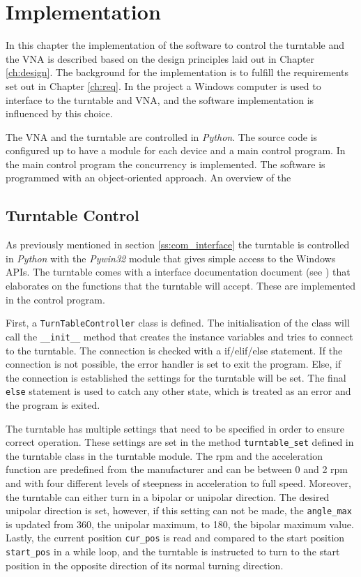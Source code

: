 \chapter{Implementation} \label{ch:implementation}
In this chapter the implementation of the software to control the turntable and the VNA is described based on the design principles laid out in Chapter \ref{ch:design}. The background for the implementation is to fulfill the requirements set out in Chapter \ref{ch:req}. In the project a Windows computer is used to interface to the turntable and VNA, and the software implementation is influenced by this choice. 

The VNA and the turntable are controlled in \textit{Python}. The source code is configured up to have a module for each device and a main control program. In the main control program the concurrency is implemented. The software is programmed with an object-oriented approach. An overview of the 

\section{Turntable Control}
As previously mentioned in section \ref{ss:com_interface} the turntable is controlled in \textit{Python} with the \textit{Pywin32} module that gives simple access to the Windows APIs. The turntable comes with a interface documentation document (see \cite{hrt_control_api_manual}) that elaborates on the functions that the turntable will accept. These are implemented in the control program. 

First, a \verb+TurnTableController+ class is defined. The initialisation of the class will call the \verb+__init__+ method that creates the instance variables and tries to connect to the turntable. The connection is checked with a if/elif/else statement. If the connection is not possible, the error handler is set to exit the program. Else, if the connection is established the settings for the turntable will be set. The final \verb+else+ statement is used to catch any other state, which is treated as an error and the program is exited.

The turntable has multiple settings that need to be specified in order to ensure correct operation. These settings are set in the method \verb+turntable_set+ defined in the turntable class in the turntable module. The rpm and the acceleration function are predefined from the manufacturer and can be between 0 and 2 rpm and with four different levels of steepness in acceleration to full speed. Moreover, the turntable can either turn in a bipolar or unipolar direction. The desired unipolar direction is set, however, if this setting can not be made, the \verb+angle_max+ is updated from 360, the unipolar maximum, to 180, the bipolar maximum value. Lastly, the current position \verb+cur_pos+ is read and compared to the start position \verb+start_pos+ in a while loop, and the turntable is instructed to turn to the start position in the opposite direction of its normal turning direction.

